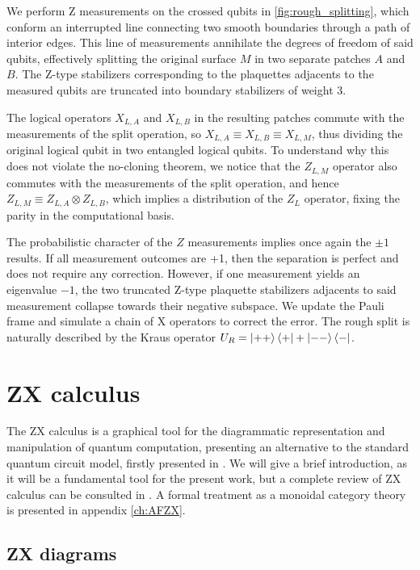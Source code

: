 \documentclass[12pt, twoside, openany]{book}
\begin{document}
We perform Z measurements on the crossed qubits in \ref{fig:rough_splitting}, which conform an interrupted line connecting two smooth boundaries through a path of interior edges. This line of measurements annihilate the degrees of freedom of said qubits, effectively splitting the original surface $M$ in two separate patches $A$ and $B$. The Z-type stabilizers corresponding to the plaquettes adjacents to the measured qubits are truncated into boundary stabilizers of weight 3. 

The logical operators $X_{L,A}$ and $X_{L,B}$ in the resulting patches commute with the measurements of the split operation, so $X_{L,A} \equiv X_{L,B} \equiv X_{L,M}$, thus dividing the original logical qubit in two entangled logical qubits. To understand why this does not violate the no-cloning theorem, we notice that the $Z_{L,M}$ operator also commutes with the measurements of the split operation, and hence $Z_{L,M} \equiv Z_{L,A} \otimes Z_{L,B}$, which implies a distribution of the $Z_L$ operator, fixing the parity in the computational basis. 

The probabilistic character of the $Z$ measurements implies once again the $\pm1$ results. If all measurement outcomes are +1, then the separation is perfect and does not require any correction. However, if one measurement yields an eigenvalue $-1$, the two truncated Z-type plaquette stabilizers adjacents to said measurement collapse towards their negative subspace. We update the Pauli frame and simulate a chain of X operators to correct the error. The rough split is naturally described by the Kraus operator $U_R = \ket{++} \bra{+} + \ket{--} \bra{-}$.

\chapter{ZX calculus} \label{ch:ZXC}

The ZX calculus is a graphical tool for the diagrammatic representation and manipulation of quantum computation, presenting an alternative to the standard quantum circuit model, firstly presented in \cite{Coecke_2011}. We will give a brief introduction, as it will be a fundamental tool for the present work, but a complete review of ZX calculus can be consulted in \cite{KissingerWetering2024Book}. A formal treatment as a monoidal category theory is presented in appendix \ref{ch:AFZX}.

\section{ZX diagrams}
\end{document}
